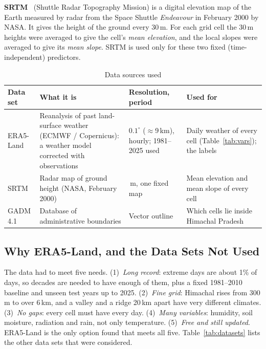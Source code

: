 \documentclass[12pt,a4paper]{report}
\begin{document}
\textbf{SRTM}~\cite{farr2007srtm} (Shuttle Radar Topography Mission) is a digital elevation map of the Earth measured by
radar from the Space Shuttle \emph{Endeavour} in February 2000 by NASA. It gives the height of the ground every 30\,m.
For each grid cell the 30\,m heights were averaged to give the cell's \emph{mean elevation}, and the local slopes were
averaged to give its \emph{mean slope}. SRTM is used only for these two fixed (time-independent) predictors.

\begin{table}[H]
\centering
\caption{Data sources used}
\label{tab:sources}
\footnotesize
\begin{tabularx}{\textwidth}{|>{\raggedright\arraybackslash}p{2.0cm}|>{\raggedright\arraybackslash}X|>{\raggedright\arraybackslash}p{2.6cm}|>{\raggedright\arraybackslash}p{3.7cm}|}
\hline
\textbf{Data set} & \textbf{What it is} & \textbf{Resolution, period} & \textbf{Used for}\\ \hline
ERA5-Land & Reanalysis of past land-surface weather (ECMWF / Copernicus): a weather model corrected with observations &
  $0.1^\circ$ ($\approx$9\,km), hourly; 1981--2025 used & Daily weather of every cell (Table~\ref{tab:vars}); the
  labels \\ \hline
SRTM & Radar map of ground height (NASA, February 2000) & 30\,m, one fixed map & Mean elevation and mean slope of
  every cell \\ \hline
GADM 4.1 & Database of administrative boundaries & Vector outline & Which cells lie inside Himachal Pradesh \\ \hline
\end{tabularx}
\end{table}

\subsection{Why ERA5-Land, and the Data Sets Not Used}
The data had to meet five needs. (1)~\emph{Long record}: extreme days are about 1\% of days, so decades are needed to
have enough of them, plus a fixed 1981--2010 baseline and unseen test years up to 2025. (2)~\emph{Fine grid}:
Himachal rises from 300\,m to over 6\,km, and a valley and a ridge 20\,km apart have very different climates.
(3)~\emph{No gaps}: every cell must have every day. (4)~\emph{Many variables}: humidity, soil moisture, radiation and
rain, not only temperature. (5)~\emph{Free and still updated}. ERA5-Land is the only option found that meets all five.
Table~\ref{tab:datasets} lists the other data sets that were considered.
\end{document}
